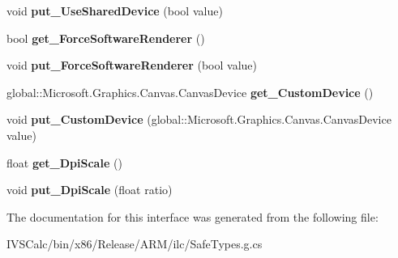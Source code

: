 \begin{DoxyCompactItemize}
void {\bfseries put\+\_\+\+Use\+Shared\+Device} (bool value)
\item 
\mbox{\label{interface_microsoft_1_1_graphics_1_1_canvas_1_1_u_i_1_1_xaml_1_1_i_canvas_virtual_control_a1b59374f3682d64e7f4ba4d0147bf6ea}} 
bool {\bfseries get\+\_\+\+Force\+Software\+Renderer} ()
\item 
\mbox{\label{interface_microsoft_1_1_graphics_1_1_canvas_1_1_u_i_1_1_xaml_1_1_i_canvas_virtual_control_a2ae32846242cb42efe1f37fe8b5f779c}} 
void {\bfseries put\+\_\+\+Force\+Software\+Renderer} (bool value)
\item 
\mbox{\label{interface_microsoft_1_1_graphics_1_1_canvas_1_1_u_i_1_1_xaml_1_1_i_canvas_virtual_control_a3a4397e75ab2f3349c04e22eb675175b}} 
global\+::\+Microsoft.\+Graphics.\+Canvas.\+Canvas\+Device {\bfseries get\+\_\+\+Custom\+Device} ()
\item 
\mbox{\label{interface_microsoft_1_1_graphics_1_1_canvas_1_1_u_i_1_1_xaml_1_1_i_canvas_virtual_control_a537ad643145f8b36cfe1543eb61d3eb8}} 
void {\bfseries put\+\_\+\+Custom\+Device} (global\+::\+Microsoft.\+Graphics.\+Canvas.\+Canvas\+Device value)
\item 
\mbox{\label{interface_microsoft_1_1_graphics_1_1_canvas_1_1_u_i_1_1_xaml_1_1_i_canvas_virtual_control_a3a41a9a5588a50fb8543bc7b2fe40a83}} 
float {\bfseries get\+\_\+\+Dpi\+Scale} ()
\item 
\mbox{\label{interface_microsoft_1_1_graphics_1_1_canvas_1_1_u_i_1_1_xaml_1_1_i_canvas_virtual_control_a41445930b2afc9f40e2817d563c3b188}} 
void {\bfseries put\+\_\+\+Dpi\+Scale} (float ratio)
\end{DoxyCompactItemize}


The documentation for this interface was generated from the following file\+:\begin{DoxyCompactItemize}
\item 
I\+V\+S\+Calc/bin/x86/\+Release/\+A\+R\+M/ilc/Safe\+Types.\+g.\+cs\end{DoxyCompactItemize}
